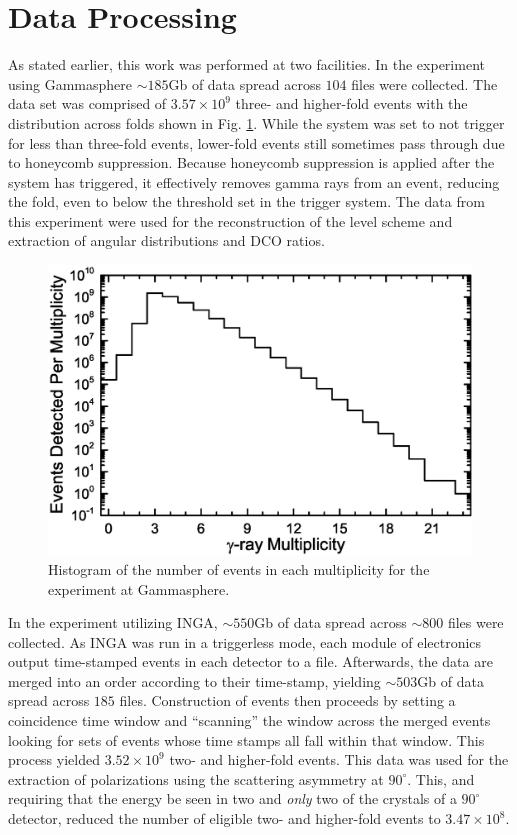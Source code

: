 \section{Data Processing}
\label{sec:exp-pr-data-proc}
 As stated earlier, this work was performed at two facilities. In the experiment using Gammasphere $\sim{}185$Gb of data spread across $104$ files were collected. The data set was comprised of $3.57\times{}10^9$ three- and higher-fold events with the distribution across folds shown in Fig. \ref{fig:chp3-gs_event_pattern}. While the system was set to not trigger for less than three-fold events, lower-fold events still sometimes pass through due to honeycomb suppression. Because honeycomb suppression is applied after the system has triggered, it effectively removes gamma rays from an event, reducing the fold, even to below the threshold set in the trigger system. The data from this experiment were used for the reconstruction of the level scheme and extraction of angular distributions and DCO ratios.
 
\begin{figure}[h!]
	\centerline{\includegraphics[height=0.25\textheight]{./img/c3/gs_event_plot.eps}}
	\caption{Histogram of the number of events in each multiplicity for the experiment at Gammasphere.}
	\label{fig:chp3-gs_event_pattern}
\end{figure}
 
In the experiment utilizing INGA, $\sim{}550$Gb of data spread across $\sim800$ files were collected. As INGA was run in a triggerless mode, each module of electronics output time-stamped events in each detector to a file. Afterwards, the data are merged into an order according to their time-stamp, yielding $\sim{}503$Gb of data spread across $185$ files. Construction of events then proceeds by setting a coincidence time window and ``scanning'' the window across the merged events looking for sets of events whose time stamps all fall within that window. This process yielded $3.52\times{}10^9$ two- and higher-fold events. This data was used for the extraction of polarizations using the scattering asymmetry at $90^{\circ{}}$. This, and requiring that the energy be seen in two and \emph{only} two of the crystals of a $90^{\circ{}}$ detector, reduced the number of eligible two- and higher-fold events to $3.47\times{}10^8$.
 
